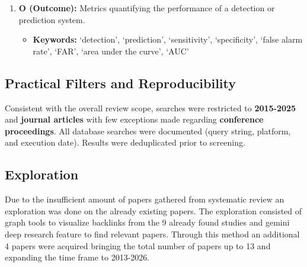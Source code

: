 \begin{enumerate}
    \item \textbf{O (Outcome):} Metrics quantifying the performance of a detection or prediction system.
    \begin{itemize}
        \item \textbf{Keywords:} `detection', `prediction', `sensitivity', `specificity', `false alarm rate', `FAR', `area under the curve', `AUC'
    \end{itemize}

\end{enumerate}


\subsection{Practical Filters and Reproducibility}
Consistent with the overall review scope, searches were restricted to
\textbf{2015-2025} and \textbf{journal articles} with few exceptions
made regarding \textbf{conference proceedings}.
All database searches were documented (query string, platform, and
execution date). Results were deduplicated prior to screening.


\subsection{Exploration}

Due to the insufficient amount of papers gathered from systematic review an exploration was done on the already existing papers.
The exploration consisted of graph tools to visualize backlinks from the 9 already found studies and gemini deep research feature to find relevant papers.
Through this method an additional 4 papers were acquired bringing the total number of papers up to 13 and expanding the time
frame to 2013-2026.